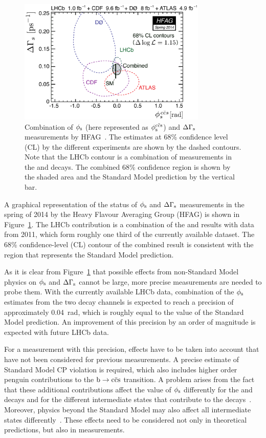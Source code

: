 \begin{figure}[tb]
  \centering
  \includegraphics[width=0.8\textwidth]{graphics/intro/hfag_spr2014_DGsphis_comb-crop}
  \caption{Combination of $\phi_\text{s}$ (here represented as $\phisccs$) and $\Delta\Gamma_\text{s}$ measurements by HFAG~\cite{Amhis:2012bh}.
           The estimates at 68\% confidence level (CL) by the different experiments are shown by the dashed contours.
           Note that the LHCb contour is a combination of measurements in the \BstoJpsiphi{} and \BstoJpsipipi{} decays.
           The combined 68\% confidence region is shown by the shaded area and the Standard Model prediction by the vertical bar.}
  \label{fig:phisDGs}
\end{figure}
A graphical representation of the status of $\phi_\text{s}$ and $\Delta\Gamma_\text{s}$ measurements in the spring of 2014 by the Heavy Flavour Averaging Group
(HFAG) is shown in Figure~\ref{fig:phisDGs}. The LHCb contribution is a combination of the \BstoJpsiphi{} and \BstoJpsipipi{} results with
data from 2011, which form roughly one third of the currently available dataset. The 68\% confidence-level (CL) contour of the combined
result is consistent with the region that represents the Standard Model prediction.

As it is clear from Figure~\ref{fig:phisDGs} that possible effects from non-Standard Model physics on $\phi_\text{s}$ and $\Delta\Gamma_\text{s}$ cannot be large,
more precise measurements are needed to probe them. With the currently available LHCb data, combination of the $\phi_\text{s}$ estimates from the
two decay channels is expected to reach a precision of approximately 0.04~rad, which is roughly equal to the value of the Standard Model
prediction. An improvement of this precision by an order of magnitude is expected with future LHCb data.

For a measurement with this precision, effects have to be taken into account that have not been considered for previous measurements. A
precise estimate of Standard Model CP violation is required, which also includes higher order penguin contributions to the $\btoccs$
transition. A problem arises from the fact that these additional contributions affect the value of $\phi_\text{s}$ differently for the
\BstoJpsiphi{} and \BstoJpsipipi{} decays and for the different intermediate states that contribute to the
decays~\cite{Faller:2008gt,*Bhattacharya:2012ph}. Moreover, physics beyond the Standard Model may also affect all intermediate states
differently~\cite{Chiang:2009ev,*Datta:2009fk}. These effects need to be considered not only in theoretical predictions, but also in
measurements.

